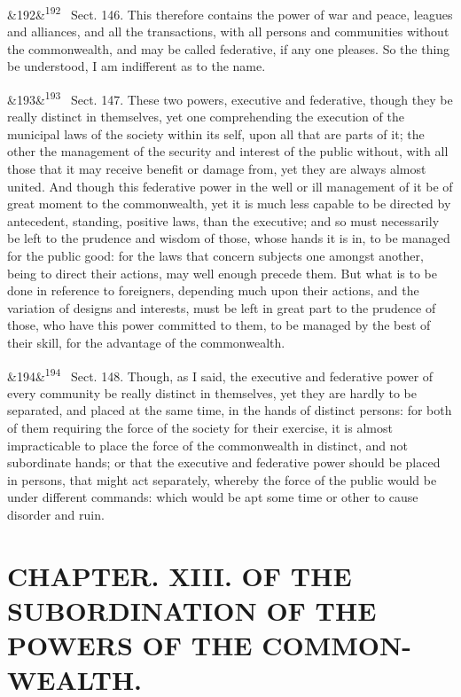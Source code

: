 \documentclass[12pt]{article}
\newcommand{\para}[1][]{\par\noindent\ifx&#1&\else\textsuperscript{\footnotesize #1}~\fi}
\begin{document}
\para[192] Sect. 146. This therefore contains the power of war and peace, leagues and alliances, and all the transactions, with all persons and communities without the commonwealth, and may be called federative, if any one pleases. So the thing be understood, I am indifferent as to the name.

\para[193] Sect. 147. These two powers, executive and federative, though they be really distinct in themselves, yet one comprehending the execution of the municipal laws of the society within its self, upon all that are parts of it; the other the management of the security and interest of the public without, with all those that it may receive benefit or damage from, yet they are always almost united. And though this federative power in the well or ill management of it be of great moment to the commonwealth, yet it is much less capable to be directed by antecedent, standing, positive laws, than the executive; and so must necessarily be left to the prudence and wisdom of those, whose hands it is in, to be managed for the public good: for the laws that concern subjects one amongst another, being to direct their actions, may well enough precede them. But what is to be done in reference to foreigners, depending much upon their actions, and the variation of designs and interests, must be left in great part to the prudence of those, who have this power committed to them, to be managed by the best of their skill, for the advantage of the commonwealth.

\para[194] Sect. 148. Though, as I said, the executive and federative power of every community be really distinct in themselves, yet they are hardly to be separated, and placed at the same time, in the hands of distinct persons: for both of them requiring the force of the society for their exercise, it is almost impracticable to place the force of the commonwealth in distinct, and not subordinate hands; or that the executive and federative power should be placed in persons, that might act separately, whereby the force of the public would be under different commands: which would be apt some time or other to cause disorder and ruin.

\section*{CHAPTER. XIII. OF THE SUBORDINATION OF THE POWERS OF THE COMMON-WEALTH.}
\end{document}
